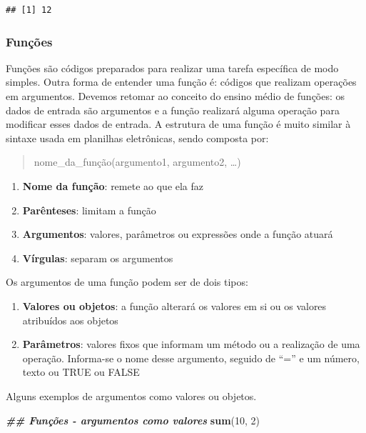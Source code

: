 \documentclass[
]{article}
\newenvironment{Shaded}{\begin{snugshade}}{\end{snugshade}}
\newcommand{\DecValTok}[1]{\textcolor[rgb]{0.00,0.00,0.81}{#1}}
\newcommand{\DocumentationTok}[1]{\textcolor[rgb]{0.56,0.35,0.01}{\textbf{\textit{#1}}}}
\newcommand{\FunctionTok}[1]{\textcolor[rgb]{0.13,0.29,0.53}{\textbf{#1}}}
\newcommand{\NormalTok}[1]{#1}
\providecommand{\tightlist}{%
  \setlength{\itemsep}{0pt}\setlength{\parskip}{0pt}}
\begin{document}
\begin{verbatim}
## [1] 12
\end{verbatim}

\hypertarget{funuxe7uxf5es}{%
\subsubsection{Funções}\label{funuxe7uxf5es}}

Funções são códigos preparados para realizar uma tarefa específica de modo simples. Outra forma de entender uma função é: códigos que realizam operações em argumentos. Devemos retomar ao conceito do ensino médio de funções: os dados de entrada são argumentos e a função realizará alguma operação para modificar esses dados de entrada. A estrutura de uma função é muito similar à sintaxe usada em planilhas eletrônicas, sendo composta por:

\begin{quote}
nome\_da\_função(argumento1, argumento2, \ldots)
\end{quote}

\begin{enumerate}
\def\labelenumi{\arabic{enumi}.}
\tightlist
\item
  \textbf{Nome da função}: remete ao que ela faz
\item
  \textbf{Parênteses}: limitam a função
\item
  \textbf{Argumentos}: valores, parâmetros ou expressões onde a função atuará
\item
  \textbf{Vírgulas}: separam os argumentos
\end{enumerate}

Os argumentos de uma função podem ser de dois tipos:

\begin{enumerate}
\def\labelenumi{\arabic{enumi}.}
\tightlist
\item
  \textbf{Valores ou objetos}: a função alterará os valores em si ou os valores atribuídos aos objetos
\item
  \textbf{Parâmetros}: valores fixos que informam um método ou a realização de uma operação. Informa-se o nome desse argumento, seguido de ``='' e um número, texto ou TRUE ou FALSE
\end{enumerate}

Alguns exemplos de argumentos como valores ou objetos.

\begin{Shaded}
\begin{Highlighting}[]
\DocumentationTok{\#\# Funções {-} argumentos como valores}
\FunctionTok{sum}\NormalTok{(}\DecValTok{10}\NormalTok{, }\DecValTok{2}\NormalTok{)}
\end{Highlighting}
\end{Shaded}
\end{document}
